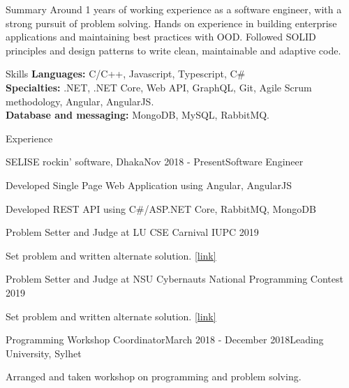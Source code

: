 \documentclass{resume}
\begin{document}

\begin{rSection}{Summary}
Around 1 years of working experience as a software engineer, with a strong pursuit of problem solving.
Hands on experience in building enterprise applications and maintaining best practices with OOD.
Followed SOLID principles and design patterns to write clean, maintainable and adaptive code.
\end{rSection}


\begin{rSection}{Skills}
{\bf Languages:} C/C++, Javascript, Typescript, C\#\\
{\bf Specialties:} .NET, .NET Core, Web API, GraphQL, Git, Agile Scrum methodology, Angular, AngularJS.\\
{\bf Database and messaging:} MongoDB, MySQL, RabbitMQ.
\end{rSection}


\begin{rSection}{Experience}

\begin{rSubsection}{SELISE rockin' software, Dhaka}{Nov 2018 - Present}{Software Engineer}{}
\item Developed Single Page Web Application using Angular, AngularJS
\item Developed REST API using C\#/ASP.NET Core, RabbitMQ, MongoDB
\end{rSubsection}

\begin{rSubsection}{Problem Setter and Judge at LU CSE Carnival IUPC 2019}{}{}{}
\item Set problem and written alternate solution. \href{https://toph.co/c/lu-cse-carnival-iupc-2019}{[link]}
\end{rSubsection}

\begin{rSubsection}{Problem Setter and Judge at NSU Cybernauts National Programming Contest 2019}{}{}{}
\item Set problem and written alternate solution. \href{https://toph.co/c/cybernauts19}{[link]}
\end{rSubsection}

\begin{rSubsection}{Programming Workshop Coordinator}{March 2018 - December 2018}{Leading University, Sylhet}{}
\item Arranged and taken workshop on programming and problem solving.
\end{rSubsection}

\end{rSection}
\end{document}
